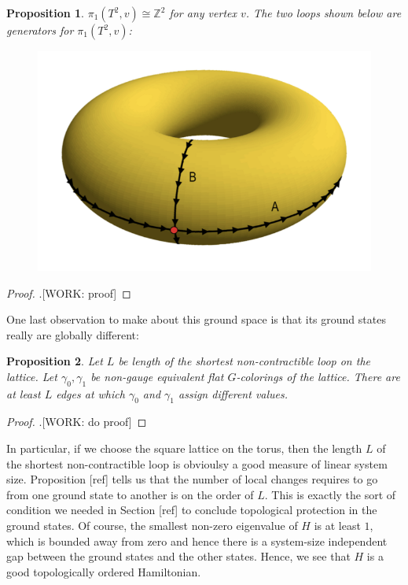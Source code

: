 \documentclass{article}
\newtheorem{proposition}{Proposition}[section]
\theoremstyle{definition}
\newcommand{\ZZ}{\mathbb{Z}}
\newcommand{\0}{\left|0\right>}
\newcommand{\1}{\left|1\right>}
\numberwithin{figure}{section}
\begin{document}
\begin{proposition} $\pi_1(T^2,v)\cong \ZZ^2$ for any vertex $v$. The two loops shown below are generators for $\pi_1(T^2,v)$:

\begin{figure}[h]
\begin{center}
\includegraphics[scale=.3]{torus}
\end{center}
\end{figure}

\end{proposition}
\begin{proof}.[WORK: proof]
\end{proof}

One last observation to make about this ground space is that its ground states really are globally different:

\begin{proposition} Let $L$ be length of the shortest non-contractible loop on the lattice. Let $\gamma_0,\gamma_1$ be non-gauge equivalent flat $G$-colorings of the lattice. There are at least $L$ edges at which $\gamma_0$ and $\gamma_1$ assign different values.
\end{proposition} 
\begin{proof}.[WORK: do proof]
\end{proof}

In particular, if we choose the square lattice on the torus, then the length $L$ of the shortest non-contractible loop is obvioulsy a good measure of linear system size. Proposition [ref] tells us that the number of local changes requires to go from one ground state to another is on the order of $L$. This is exactly the sort of condition we needed in Section [ref] to conclude topological protection in the ground states. Of course, the smallest non-zero eigenvalue of $H$ is at least $1$, which is bounded away from zero and hence there is a system-size independent gap between the ground states and the other states. Hence, we see that $H$ is a good topologically ordered Hamiltonian. 
\end{document}
